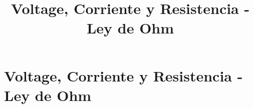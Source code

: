 \documentclass[output=paper, 
colorlinks,
citecolor=brown,
newtxmath
]{langscibook}
\author{}
\title{Voltage, Corriente y Resistencia - Ley de Ohm}
\begin{document}

\chapterfont{\Large\color{LightBlue}} 

\chapter*{Voltage, Corriente y Resistencia - Ley de Ohm} 

\begingroup
\let\clearpage\relax
\cleardoublepage
\hypersetup{linkcolor=blue}
\tableofcontents
\let\clearpage\relax
\cleardoublepage
\endgroup



{\def\addcontentsline#1#2#3{}\maketitle}


\setcounter{page}{1}




\def\maketitle{

 \makeatletter
 {\color{bl} \centering \huge \sc \textbf{
\large \vspace*{-8pt} \color{black} Voltage, Corriente y Resistencia - Ley de Ohm
 \vspace*{8pt} }\par}
 \makeatother


 \makeatletter
 {\centering \small 
 	\vspace{20pt} }
 \makeatother

}
\end{document}
